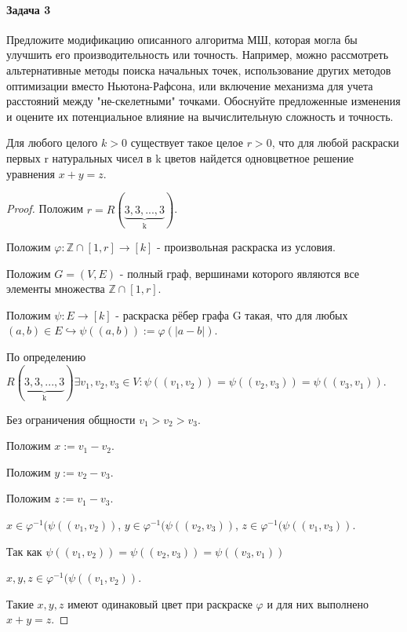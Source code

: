 \paragraph*{Задача 3}

Предложите модификацию описанного алгоритма МШ, которая могла бы улучшить его производительность или точность. Например, можно рассмотреть альтернативные методы поиска начальных точек, использование других методов оптимизации вместо Ньютона-Рафсона, или включение механизма для учета расстояний между "не-скелетными" точками. Обоснуйте предложенные изменения и оцените их потенциальное влияние на вычислительную сложность и точность.

\maketitle
\begin{theorem}[Шура]
    Для любого целого $k > 0$ существует такое целое $r > 0$, что для любой раскраски первых r натуральных чисел в k цветов найдется одновцветное решение уравнения $x + y = z$.
\end{theorem}

\begin{proof}
    Положим $r = R(\underbrace{3, 3, ..., 3}_{\textrm{k}})$.
    
    Положим $\varphi : \mathbb{Z} \cap [1, r] \to [k]$ - произвольная раскраска из условия.
    
    Положим $G = (V, E)$ - полный граф, вершинами которого являются все элементы множества $\mathbb{Z} \cap [1, r]$.
    
    Положим $\psi : E \to [k]$ - раскраска рёбер графа G такая, что для любых $(a, b) \in E \hookrightarrow \psi((a, b)) := \varphi(|a - b|)$.
    
    По определению $R(\underbrace{3, 3, ..., 3}_{\textrm{k}}) \exists v_1, v_2, v_3 \in V: \psi((v_1, v_2)) = \psi((v_2, v_3)) = \psi((v_3, v_1))$.
    
    Без ограничения общности $v_1 > v_2 > v_3$.
    
    Положим $x:= v_1 - v_2$.
    
    Положим $y:= v_2 - v_3$.
    
    Положим $z:= v_1 - v_3$.
    
    $x \in \varphi^{-1}(\psi((v_1, v_2))$, $y \in \varphi^{-1}(\psi((v_2, v_3))$, $z \in \varphi^{-1}(\psi((v_1, v_3))$.
    
    Так как $\psi((v_1, v_2)) = \psi((v_2, v_3)) = \psi((v_3, v_1))$
    
    $x, y, z \in \varphi^{-1}(\psi((v_1, v_2))$.
    
    Такие $x, y, z$ имеют одинаковый цвет при раскраске $\varphi$ и для них выполнено 
    $x + y = z$.
\end{proof}
